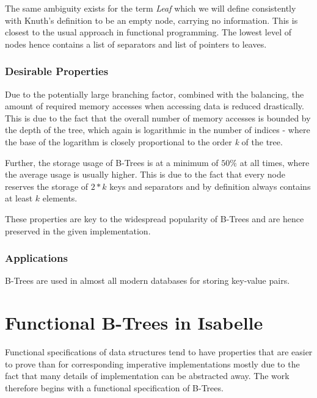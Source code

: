 The same ambiguity exists for the term \textit{Leaf} which we will define consistently with Knuth's definition \parencite{DBLP:books/lib/Knuth98a}
to be an empty node, carrying no information.
This is closest to the usual approach in functional programming.
The lowest level of nodes hence contains a list of separators and
list of pointers to leaves.


\subsection{Desirable Properties}

Due to the potentially large branching factor, combined with the balancing,
the amount of required memory accesses when accessing data is reduced drastically.
This is due to the fact that the overall number of memory accesses is bounded by the depth
of the tree, which again is logarithmic in the number of indices -
where the base of the logarithm is closely proportional to the order \textit{k} of the tree.

Further, the storage usage of B-Trees is at a minimum of $50\%$ at all times,
where the average usage is usually higher. \parencite{DBLP:journals/acta/BayerM72}
This is due to the fact that every node reserves the storage of $2*k$ keys and separators
and by definition always contains at least $k$ elements.

These properties are key to the widespread popularity of B-Trees and are
hence preserved in the given implementation.


\subsection{Applications}

B-Trees are used in almost all modern databases for storing key-value pairs.

\chapter{Functional B-Trees in Isabelle}\label{chapter:abs-set}

Functional specifications of data structures tend to have properties that
are easier to prove than for corresponding imperative implementations
mostly due to the fact that many details of implementation can be abstracted away.
The work therefore begins with a functional specification of B-Trees.


